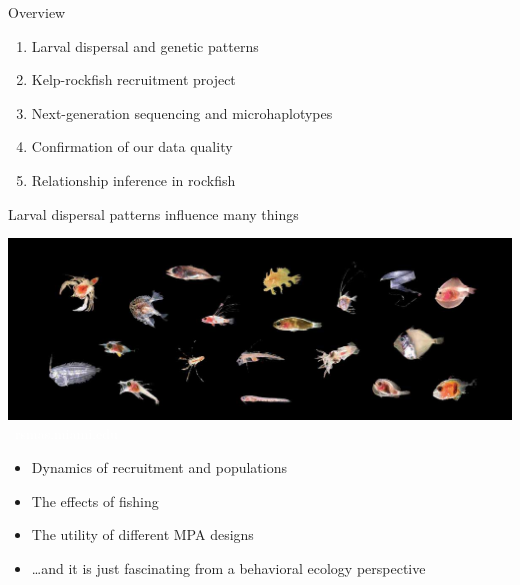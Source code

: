 \documentclass[letter,graphicx]{beamer}
\begin{document}
%



\begin{frame}{Overview}
\begin{enumerate}
\item Larval dispersal and genetic patterns
\item Kelp-rockfish recruitment project
\item Next-generation sequencing and microhaplotypes
\item Confirmation of our data quality
\item Relationship inference in rockfish
\end{enumerate}

\end{frame}







\begin{frame}{Larval dispersal patterns influence many things}

\includegraphics[width = \textwidth]{./figs/many_larvae.jpg}\\
{\tiny \vspace*{-4.5ex} \textcolor{white}{~rsmas.miami.edu}}

{\small
\begin{itemize}
\item Dynamics of recruitment and populations
\item The effects of fishing
\item The utility of different MPA designs
\item \ldots and it is just fascinating from a behavioral ecology perspective
\end{itemize}
}
\end{frame}
\end{document}
